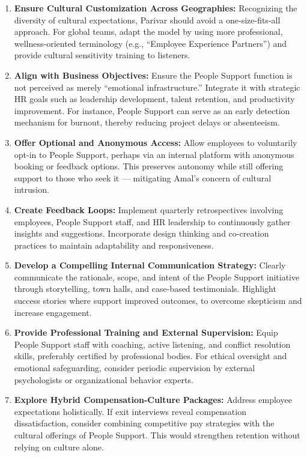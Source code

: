 \documentclass[10pt,a4paper]{book}
\begin{document}
\begin{multicols}{2}
\begin{enumerate}
    \item \textbf{Ensure Cultural Customization Across Geographies:}
    Recognizing the diversity of cultural expectations, Parivar should avoid a one-size-fits-all approach. For global teams, adapt the model by using more professional, wellness-oriented terminology (e.g., “Employee Experience Partners”) and provide cultural sensitivity training to listeners.

    \item \textbf{Align with Business Objectives:}
    Ensure the People Support function is not perceived as merely “emotional infrastructure.” Integrate it with strategic HR goals such as leadership development, talent retention, and productivity improvement. For instance, People Support can serve as an early detection mechanism for burnout, thereby reducing project delays or absenteeism.

    \item \textbf{Offer Optional and Anonymous Access:}
    Allow employees to voluntarily opt-in to People Support, perhaps via an internal platform with anonymous booking or feedback options. This preserves autonomy while still offering support to those who seek it — mitigating Amal’s concern of cultural intrusion.

    \item \textbf{Create Feedback Loops:}
    Implement quarterly retrospectives involving employees, People Support staff, and HR leadership to continuously gather insights and suggestions. Incorporate design thinking and co-creation practices to maintain adaptability and responsiveness.

    \item \textbf{Develop a Compelling Internal Communication Strategy:}
    Clearly communicate the rationale, scope, and intent of the People Support initiative through storytelling, town halls, and case-based testimonials. Highlight success stories where support improved outcomes, to overcome skepticism and increase engagement.

    \item \textbf{Provide Professional Training and External Supervision:}
    Equip People Support staff with coaching, active listening, and conflict resolution skills, preferably certified by professional bodies. For ethical oversight and emotional safeguarding, consider periodic supervision by external psychologists or organizational behavior experts.

    \item \textbf{Explore Hybrid Compensation-Culture Packages:}
    Address employee expectations holistically. If exit interviews reveal compensation dissatisfaction, consider combining competitive pay strategies with the cultural offerings of People Support. This would strengthen retention without relying on culture alone.


\end{enumerate}
\end{multicols}
\end{document}

